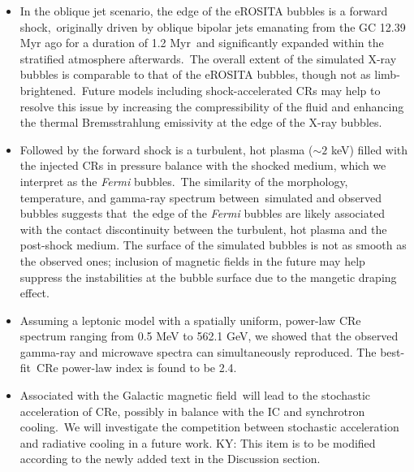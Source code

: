 \documentclass[fleqn,usenatbib,useAMS]{mnras}
\begin{document}
\begin{itemize}
\item In the oblique jet scenario, the edge of the eROSITA bubbles is a forward shock,\
      originally driven by oblique bipolar jets emanating from the GC 12.39 Myr ago for a duration of 1.2 Myr\
      and significantly expanded within the stratified atmosphere afterwards.\
      The overall extent of the simulated X-ray bubbles is comparable to that of the eROSITA bubbles, though not as limb-brightened.\
      Future models including shock-accelerated CRs may help to resolve this issue by increasing the compressibility of the fluid and enhancing the thermal Bremsstrahlung emissivity at the edge of the X-ray bubbles.
\item Followed by the forward shock is a turbulent, hot plasma ($\sim2$ keV) filled with the injected CRs in pressure balance with the shocked medium, which we interpret as the \textit{Fermi} bubbles.\
      The similarity of the morphology, temperature, and gamma-ray spectrum between\
      simulated and observed bubbles suggests that\
      the edge of the \textit{Fermi} bubbles are likely associated with the contact discontinuity between the turbulent, hot plasma and the post-shock medium. The surface of the simulated bubbles is not as smooth as the observed ones; inclusion of magnetic fields in the future may help suppress the instabilities at the bubble surface due to the mangetic draping effect.
\item Assuming a leptonic model with a spatially uniform, power-law CRe spectrum ranging from 0.5 MeV to 562.1 GeV, we showed that the observed gamma-ray and microwave spectra can simultaneously reproduced. The best-fit\
      CRe power-law index is found to be 2.4.
\item Associated with the Galactic magnetic field\
      will lead to the stochastic acceleration of CRe, possibly in balance with the IC and synchrotron cooling.\
      We will investigate the competition between stochastic acceleration and radiative cooling in a future work. {\color{red} KY: This item is to be modified according to the newly added text in the Discussion section.}
\end{itemize}
\end{document}
